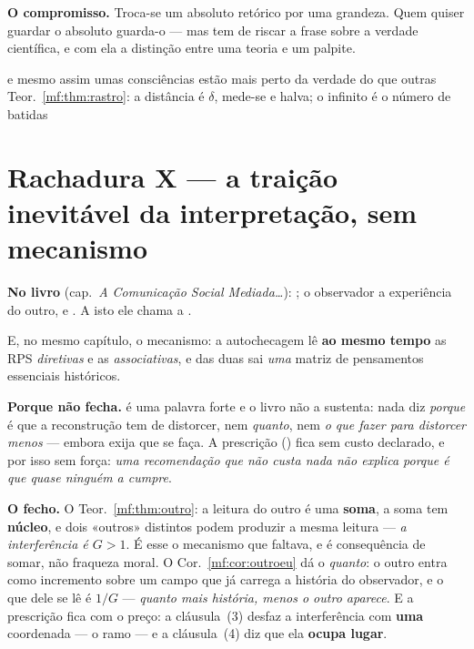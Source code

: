 \documentclass[../livro.tex]{subfiles}
\begin{document}
\medskip\noindent\textbf{O compromisso.} Troca-se um absoluto retórico por uma
grandeza. Quem quiser guardar o absoluto guarda-o --- mas tem de riscar a frase
sobre a verdade científica, e com ela a distinção entre uma teoria e um palpite.

      {e mesmo assim umas consciências estão mais perto da verdade do que
       outras}
      {Teor.~\ref{mf:thm:rastro}: a distância é $\delta$, mede-se e halva; o
       infinito é o número de batidas}

\section{Rachadura X --- a traição inevitável da interpretação, sem mecanismo}\label{mf:r10}

\noindent\textbf{No livro} (cap.~\emph{A Comunicação Social Mediada\dots}):
; o observador
 a experiência do outro, e . A isto ele chama a .

\noindent E, no mesmo capítulo, o mecanismo: a autochecagem lê \textbf{ao mesmo
tempo} as RPS \emph{diretivas} e as \emph{associativas}, e das duas sai
\emph{uma} matriz de pensamentos essenciais históricos.

\medskip\noindent\textbf{Porque não fecha.}  é uma palavra forte
e o livro não a sustenta: nada diz \emph{porque} é que a reconstrução tem de
distorcer, nem \emph{quanto}, nem \emph{o que fazer para distorcer menos} ---
embora exija que se faça. A prescrição () fica sem custo declarado, e por isso sem força: \emph{uma recomendação
que não custa nada não explica porque é que quase ninguém a cumpre}.

\medskip\noindent\textbf{O fecho.} O Teor.~\ref{mf:thm:outro}: a leitura do outro
é uma \textbf{soma}, a soma tem \textbf{núcleo}, e dois «outros» distintos podem
produzir a mesma leitura --- \emph{a interferência é $G>1$}. É esse o mecanismo
que faltava, e é consequência de somar, não fraqueza moral. O
Cor.~\ref{mf:cor:outroeu} dá o \emph{quanto}: o outro entra como incremento sobre
um campo que já carrega a história do observador, e o que dele se lê é $1/G$ ---
\emph{quanto mais história, menos o outro aparece}. E a prescrição fica com o
preço: a cláusula~(3) desfaz a interferência com \textbf{uma} coordenada --- o
ramo --- e a cláusula~(4) diz que ela \textbf{ocupa lugar}.
\end{document}
